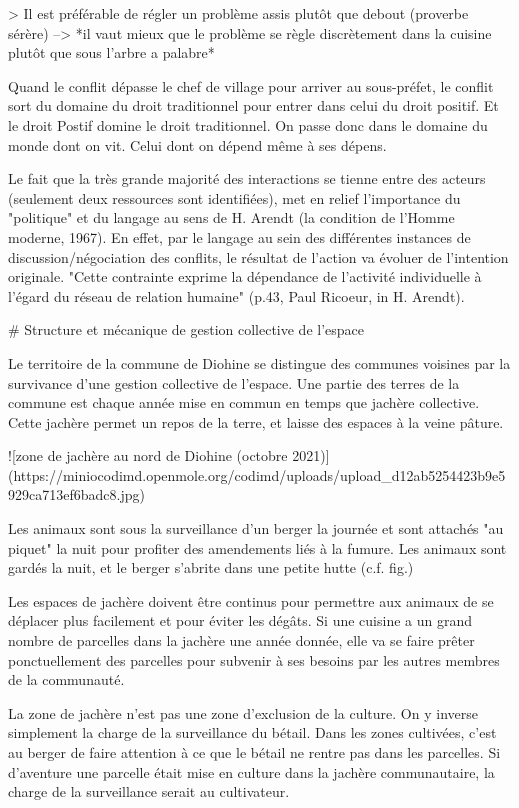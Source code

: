 > Il est préférable de régler un problème assis plutôt que debout (proverbe sérère) --> *il vaut mieux que le problème se règle discrètement dans la cuisine plutôt que sous l'arbre a palabre*

Quand le conflit dépasse le chef de village pour arriver au sous-préfet, le conflit sort du domaine du droit traditionnel pour entrer dans celui du droit positif. Et le droit Postif domine le droit traditionnel. On passe donc dans le domaine du monde dont on vit. Celui dont on dépend même à ses dépens.

Le fait que la très grande majorité des interactions se tienne  entre des  acteurs (seulement deux ressources sont identifiées), met en relief l'importance du "politique" et du langage au sens de H. Arendt (la condition de l'Homme moderne, 1967). En effet, par le langage au sein des différentes instances de discussion/négociation des conflits, le résultat de l'action va évoluer de l'intention originale. "Cette contrainte exprime la dépendance de l'activité individuelle à l'égard du réseau de relation humaine" (p.43, Paul Ricoeur, in H. Arendt).

# Structure et mécanique de gestion collective de l'espace

Le territoire de la commune de Diohine se distingue des communes voisines par la survivance d'une gestion collective de l'espace. Une partie des terres de la commune est chaque année mise en commun en temps que jachère collective. Cette jachère permet un repos de la terre, et laisse des espaces à la veine pâture. 

![zone de jachère au nord de Diohine (octobre 2021)](https://miniocodimd.openmole.org/codimd/uploads/upload_d12ab5254423b9e5929ca713ef6badc8.jpg)

Les animaux sont  sous la surveillance d'un berger la journée et sont attachés "au piquet" la nuit pour profiter des amendements liés à la fumure. Les animaux sont gardés la nuit, et le berger s'abrite dans une petite hutte (c.f. fig.)

Les espaces de jachère doivent être continus pour permettre aux animaux de se déplacer plus facilement et pour éviter les dégâts. Si une cuisine a un grand nombre de parcelles dans la jachère une année donnée, elle va se faire prêter ponctuellement des parcelles pour subvenir à ses besoins par les autres membres de la communauté. 

La zone de jachère n'est pas une zone d'exclusion de la culture. On y inverse simplement la charge de la surveillance du bétail. Dans les zones cultivées, c'est au berger de faire attention à ce que le bétail ne rentre pas dans les parcelles. Si d'aventure une parcelle était mise en culture dans la jachère communautaire, la charge de la surveillance serait au cultivateur. 

